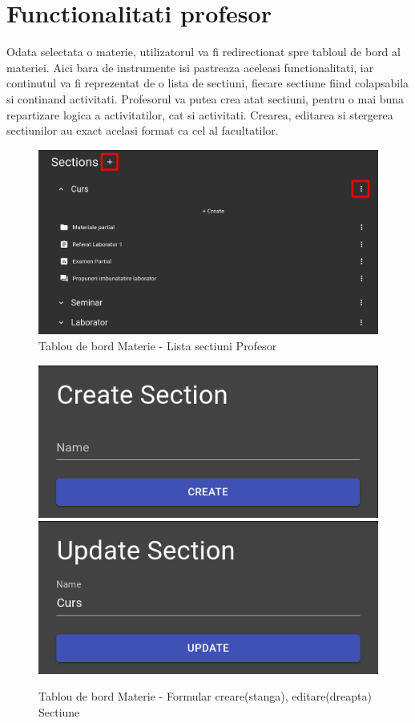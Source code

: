 \documentclass[12pt, a4paper, oneside, romanian]{teza-upb}
\begin{document}
\section{Functionalitati profesor}

Odata selectata o materie, utilizatorul va fi redirectionat spre tabloul de bord al materiei. Aici bara de instrumente isi pastreaza aceleasi functionalitati, iar continutul va fi reprezentat de o lista de sectiuni, fiecare sectiune fiind colapsabila si continand activitati. Profesorul va putea crea atat sectiuni, pentru o mai buna repartizare logica a activitatilor, cat si activitati. Crearea, editarea si stergerea sectiunilor au exact acelasi format ca cel al facultatilor.

\begin{figure}[H]
\centering
\includegraphics*[width=\columnwidth]{tablou-de-bord-materie-lista-sectiuni-profesor}
\caption{Tablou de bord Materie - Lista sectiuni Profesor}
\label{tablou-de-bord-materie-lista-sectiuni-profesor}
\end{figure}

\begin{figure}[H]
\centering
\includegraphics*[width=0.45\columnwidth]{tablou-de-bord-materie-formular-creare-sectiune}
\includegraphics*[width=0.45\columnwidth]{tablou-de-bord-materie-formular-editare-sectiune}
\caption{Tablou de bord Materie - Formular creare(stanga), editare(dreapta) Sectiune}
\label{tablou-de-bord-materie-formular-sectiune}
\end{figure}
\end{document}
